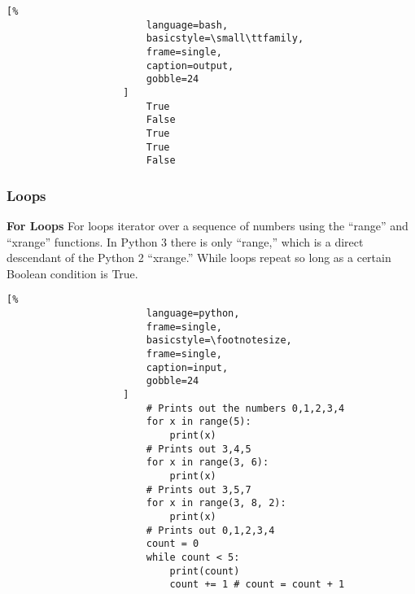 \documentclass[crop=false,class=article,oneside]{standalone}
\begin{document}
                \begin{minipage}[t]{.48\textwidth}
                    \centering
                    \begin{lstlisting}[%
                        language=bash,
                        basicstyle=\small\ttfamily,
                        frame=single,
                        caption=output,
                        gobble=24
                    ]
                        True
                        False
                        True
                        True
                        False
                    \end{lstlisting}
                \end{minipage}
        \subsubsection{Loops}
            \textbf{For Loops}
                For loops iterator over a sequence of numbers using
                the ``range'' and ``xrange'' functions. In Python 3
                there is only ``range,'' which is a direct descendant
                of the Python 2 ``xrange.'' While loops repeat so
                long as a certain Boolean condition is True. \newline
                \begin{minipage}[t]{.48\textwidth}
                    \centering
                    \begin{lstlisting}[%
                        language=python,
                        frame=single,
                        basicstyle=\footnotesize,
                        frame=single,
                        caption=input,
                        gobble=24
                    ]
                        # Prints out the numbers 0,1,2,3,4
                        for x in range(5):
                            print(x)
                        # Prints out 3,4,5
                        for x in range(3, 6):
                            print(x)
                        # Prints out 3,5,7
                        for x in range(3, 8, 2):
                            print(x)
                        # Prints out 0,1,2,3,4
                        count = 0
                        while count < 5:
                            print(count)
                            count += 1 # count = count + 1
                    \end{lstlisting}
                \end{minipage}\hfill
\end{document}
